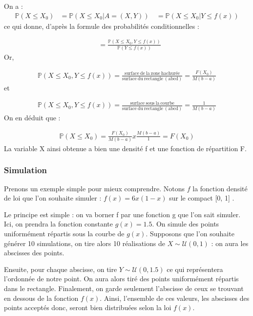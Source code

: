 \documentclass[10pt]{article} %
\begin{document}
On a :
\begin{align}
\mathbb{P}(X \leq X_0) &= \mathbb{P}(X \leq  X_0 | A = (X, Y) ) \
&= \mathbb{P}(X \leq  X_0 | Y \leq f(x) )
\end{align}
ce qui donne, d'après la formule des probabilités conditionnelles :

\begin{align}
&= \frac{\mathbb{P}(X \leq  X_0, Y \leq f(x) )}{\mathbb{P}(Y \leq f(x))}
\end{align}
Or,

\begin{align}
\mathbb{P}(X \leq  X_0, Y \leq f(x) ) = \frac{\mathrm{surface\ de\ la\ zone\ hachurée}}{\mathrm{surface\ du\ rectangle\ (abcd)}} = \frac{F(X_0)}{M(b-a)}
\end{align}
et

\begin{align}
\mathbb{P}(X \leq  X_0, Y \leq f(x) ) = \frac{\mathrm{surface\ sous\ la\ courbe}}{\mathrm{surface\ du\ rectangle\ (abcd)}} = \frac{1}{M(b-a)}
\end{align}
On en déduit que :

\begin{align}
\mathbb{P}(X \leq X_0) = \frac{F(X_0)}{M(b-a)} x \frac{M(b-a)}{1}=F(X_0)
\end{align}
La variable X ainsi obtenue a bien une densité f et une fonction de
répartition F.

\subsubsection{Simulation}

Prenons un exemple simple pour mieux comprendre. Notons $f$ la fonction densité de loi que l'on souhaite simuler : $f(x) = 6x(1-x) $ sur le compact [0, 1] .

Le principe est simple : on va borner f par une fonction g que l'on sait simuler. Ici, on prendra la fonction constante $g(x) = 1.5 $. On simule des points uniformément répartis sous la courbe de $g(x)$. Supposons que l'on souhaite générer 10 simulations, on tire alors 10 réalisations de $X \sim \mathcal{U}(0, 1)$ : on aura les abscisses des points.

Ensuite, pour chaque abscisse, on tire $Y \sim \mathcal{U}(0, 1.5)$ ce qui représentera l'ordonnée de notre point. On aura alors tiré des points uniformément répartis dans le rectangle. Finalement, on garde seulement l'abscisse de ceux se trouvant en dessous de la fonction $f(x)$. Ainsi, l'ensemble de ces valeurs, les abscisses des points acceptés donc, seront bien distribuées selon la loi $f(x)$.
\end{document}

